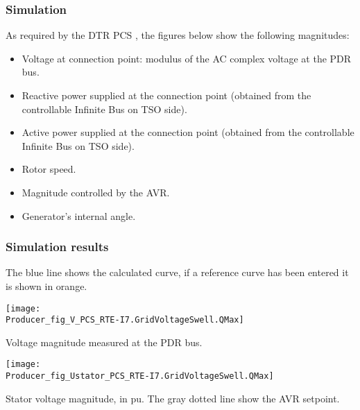     \subsubsection{Simulation}
    As required by the DTR PCS \DTRPcs, the figures below show the
    following magnitudes:
    \begin{itemize}
        \item Voltage at connection point: modulus of the AC complex voltage at
        the PDR bus.
        \item Reactive power supplied at the connection point (obtained from
        the controllable Infinite Bus on TSO side).
        \item Active power supplied at the connection point (obtained from
        the controllable Infinite Bus on TSO side).
        \item Rotor speed.
        \item Magnitude controlled by the AVR.
        \item Generator's internal angle.
    \end{itemize}

    \subsubsection{Simulation results}
    The blue line shows the calculated curve, if a reference curve has been entered it is
    shown in orange.

    \noindent
    \begin{minipage}[t]{0.48\textwidth}
        \centering
        \texttt{[image: \\Producer\_fig\_V\_PCS\_RTE-I7.GridVoltageSwell.QMax]}
        \begin{minipage}[t]{0.8\textwidth}
            \small Voltage magnitude measured at the PDR bus.
        \end{minipage}
    \end{minipage}
    \hfill
    \begin{minipage}[t]{0.48\textwidth}
        \centering
        \texttt{[image: \\Producer\_fig\_Ustator\_PCS\_RTE-I7.GridVoltageSwell.QMax]}
        \begin{minipage}[t]{0.8\textwidth}
            \small Stator voltage magnitude, in pu. The gray dotted line show
            the AVR setpoint.
        \end{minipage}
    \end{minipage}

